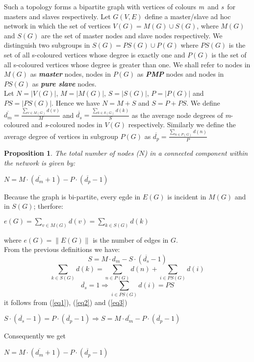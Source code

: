\documentclass[twocolumn,10pt,conference]{IEEEtran}
\newtheorem{myprop}[thrm]{Proposition}
\begin{document}
Such a topology forms a bipartite graph with vertices of colours \textit{m}\ and \textit{s}\ for masters and slaves 
respectively. Let $G(V,E)$ define a master/slave ad hoc network in which the set of vertices $V(G) = M(G) \cup S(G)$, where 
$M(G)$ and $S(G)$ are the set of master nodes and slave nodes respectively. We distinguish two subgroups in 
$S(G)=PS(G) \cup P(G)$ where $PS(G)$ is the set of all s-coloured vertices whose degree is exactly one and $P(G)$ is the 
set of all s-coloured vertices whose degree is greater than one. We shall refer to nodes in $M(G)$ as \textit{\bf{master}} 
nodes, nodes in $P(G)$ as \textit{\bf{PMP}} nodes and nodes in $PS(G)$ as \textit{\bf{pure slave}} nodes.\\
Let $N=|V(G)|$, $M=|M(G)|$, $S=|S(G)|$, $P=|P(G)|$ and $PS=|PS(G)|$. Hence we have $N=M+S$ and $S=P+PS$.
We define 
$\overline{d_m}=\frac{\sum_{v\in M(G)} d(v)}{M}$ 
and 
$\overline{d_s}=\frac{\sum_{k\in S(G)} d(k)}{S}$ 
as the average node degrees of \textit{m}-coloured and \textit{s}-coloured nodes in $V(G)$ respectively. Similarly we 
define the average degree of vertices in subgroup $P(G)$ as
$\overline{d_p}=\frac{\sum_{n\in P(G)} d(n)}{P}$ 

\begin{myprop}
The total number of nodes ($N$) in a connected component within the network is given by:
\begin{center}
$N = M\cdot (\overline{d_m}+1) - P\cdot (\overline{d_p} - 1)$
\label{proposition}
\end{center}
\end{myprop}


\begin{IEEEproof}
 Because the graph is bi-partite, every egde in $E(G)$ is incident in $M(G)$ and in $S(G)$; therfore:
\begin{center}
$e(G)=\sum_{v\in M(G)} d(v) = \sum_{k\in S(G)} d(k)$
\end{center}
where $e(G)=\|E(G)\|$ is the number of edges in $G$.\\
From the previous definitions we have:
\begin{equation}
 S=M\cdot d_m-S\cdot (\overline{d_s}-1)
 \label{eq1}
\end{equation}
\begin{equation}
 \sum_{k\in S(G)}d(k)=\sum_{n\in P(G)}d(n)+\sum_{i\in PS(G)} d(i)
 \label{eq2}
\end{equation}
\begin{equation}
 \overline{d_s}=1\Rightarrow\sum_{i\in PS(G)}d(i)=PS
 \label{eq3}
\end{equation}
it follows from (\ref{eq1}), (\ref{eq2}) and (\ref{eq3})
\begin{center}
 $S\cdot (\overline{d_s}-1)=P\cdot (\overline{d_p}-1)\Rightarrow S=M\cdot \overline{d_m}-P\cdot (\overline{d_p}-1)$
\end{center}
Consequently we get \begin{center}
 $N = M\cdot (\overline{d_m}+1) - P\cdot (\overline{d_p} - 1)$
\end{center}
\end{IEEEproof}
\end{document}
